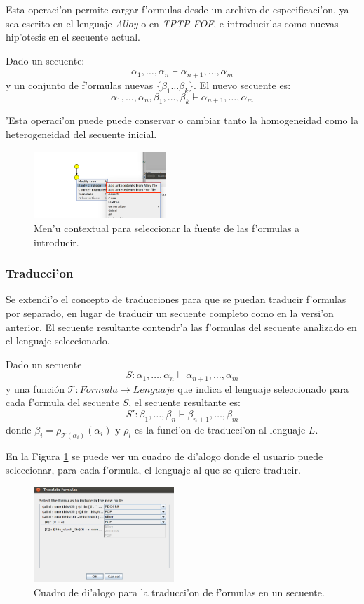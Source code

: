 Esta operaci'on permite cargar f'ormulas desde un archivo de especificaci'on, ya sea escrito en el lenguaje \textit{Alloy} o en \textit{TPTP-FOF}, e introducirlas como nuevas hip'otesis en el secuente actual.

Dado un secuente:
$$ \alpha_1,\ldots,\alpha_n \vdash \alpha_{n+1},\ldots,\alpha_m $$
y un conjunto de f'ormulas nuevas $\{\beta_1 \ldots \beta_k\}$. El nuevo secuente es:
$$ \alpha_1,\ldots,\alpha_n,\beta_1,\ldots, \beta_k \vdash \alpha_{n+1},\ldots,\alpha_m $$

'Esta operaci'on puede puede conservar o cambiar tanto la homogeneidad como la heterogeneidad del secuente inicial.

\begin{figure}
\centering
\parbox{5cm}{
\includegraphics[width=5cm]{img/add_antecedents_1.png}	
\caption{Men'u contextual para seleccionar la fuente de las f'ormulas a introducir.}}
\end{figure}


\subsubsection{Traducci'on}

Se extendi'o el concepto de traducciones para que se puedan traducir f'ormulas por separado, en lugar de traducir un secuente completo como en la versi'on anterior.
El secuente resultante contendr'a las f'ormulas del secuente analizado en el lenguaje seleccionado.

Dado un secuente $$ S: \alpha_1,\ldots,\alpha_n \vdash \alpha_{n+1},\ldots,\alpha_m $$
y una función  $\mathcal{T}:Formula\rightarrow Lenguaje$ que indica el lenguaje seleccionado para cada f'ormula del secuente $S$, el secuente resultante es:
$$ S': \beta_1,\ldots,\beta_n \vdash \beta_{n+1},\ldots,\beta_m $$
donde $\beta_{i} = \rho_{\mathcal{T}(\alpha_i)}(\alpha_i)$ y $\rho_l$ es la funci'on de traducci'on al lenguaje $L$.

En la Figura \ref{GUI form translation} se puede ver un cuadro de di'alogo donde el usuario puede seleccionar, para cada f'ormula, el lenguaje al que se quiere traducir.

\begin{figure}[tbh]
	\includegraphics[width=200px]{img/translate.png}
	\centering
	\caption{Cuadro de di'alogo para la traducci'on de f'ormulas en un secuente.} \label{GUI form translation}
\end{figure}

